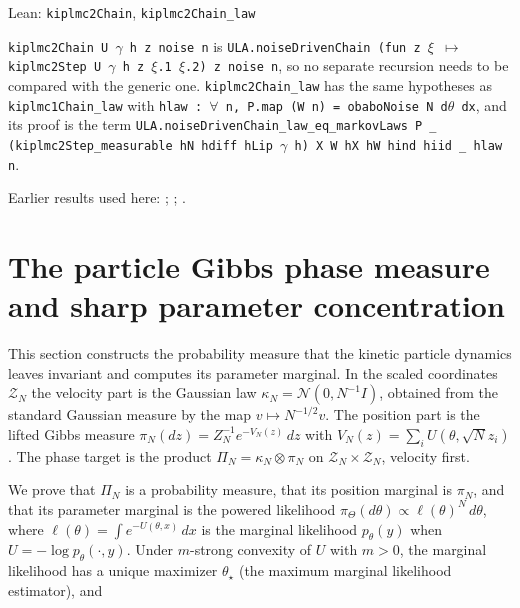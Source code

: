 \documentclass[11pt,a4paper]{report}
\newcommand{\leanlabel}[1]{\par\smallskip\noindent{\small\bfseries #1}\par}
\begin{document}
\begin{leanbox}{Lean: \texttt{kiplmc2Chain}, \texttt{kiplmc2Chain\_\allowbreak{}law}}
\leanlabel{How the Lean proof follows the argument}
\texttt{kiplmc2\allowbreak{}Chain U \ensuremath{\gamma} h z noise n} is \texttt{ULA.\allowbreak{}noise\allowbreak{}Driven\allowbreak{}Chain (fun z \ensuremath{\xi} \ensuremath{\mapsto} kiplmc2\allowbreak{}Step U \ensuremath{\gamma} h z \ensuremath{\xi}.\allowbreak{}1 \ensuremath{\xi}.\allowbreak{}2) z noise n}, so no separate recursion needs to be compared with the generic one. \texttt{kiplmc2\allowbreak{}Chain\_\allowbreak{}law} has the same hypotheses as \texttt{kiplmc1\allowbreak{}Chain\_\allowbreak{}law} with \texttt{hlaw : \ensuremath{\forall} n, P.\allowbreak{}map (W n) = obabo\allowbreak{}Noise N d\ensuremath{\theta} dx}, and its proof is the term \texttt{ULA.\allowbreak{}noise\allowbreak{}Driven\allowbreak{}Chain\_\allowbreak{}law\_\allowbreak{}eq\_\allowbreak{}markov\allowbreak{}Laws P \_\allowbreak{} (kiplmc2\allowbreak{}Step\_\allowbreak{}measurable h\allowbreak{}N hdiff h\allowbreak{}Lip \ensuremath{\gamma} h) X W h\allowbreak{}X h\allowbreak{}W hind hiid \_\allowbreak{} hlaw n}.
\end{leanbox}


Earlier results used here: \cite[Section~3.20.1]{LangevinLean2026ULASC}; \cite[Section~3.33.12]{LangevinLean2026ULASC}; \cite[Section~3.1.1]{LangevinLean2026IPLA}.
\section{\texorpdfstring{The particle Gibbs phase measure and sharp parameter concentration}{The particle Gibbs phase measure and sharp parameter concentration}}
\label{proof-module-KIPLMC-Target-lean}


This section constructs the probability measure that the kinetic particle dynamics leaves invariant and computes its parameter marginal. In the scaled coordinates \(\mathcal Z_N\) the velocity part is the Gaussian law \(\kappa_N=\mathcal N(0,N^{-1}I)\), obtained from the standard Gaussian measure by the map \(v\mapsto N^{-1/2}v\). The position part is the lifted Gibbs measure \(\pi_N(dz)=Z_N^{-1}e^{-V_N(z)}\,dz\) with \(V_N(z)=\sum_iU(\theta,\sqrt Nz_i)\). The phase target is the product \(\Pi_N=\kappa_N\otimes\pi_N\) on \(\mathcal Z_N\times\mathcal Z_N\), velocity first.




We prove that \(\Pi_N\) is a probability measure, that its position marginal is \(\pi_N\), and that its parameter marginal is the powered likelihood \(\pi_\Theta(d\theta)\propto\ell(\theta)^N\,d\theta\), where \(\ell(\theta)=\int e^{-U(\theta,x)}\,dx\) is the marginal likelihood \(p_\theta(y)\) when \(U=-\log p_\theta(\cdot,y)\). Under \(m\)-strong convexity of \(U\) with \(m>0\), the marginal likelihood has a unique maximizer \(\theta_\star\) (the maximum marginal likelihood estimator), and
\end{document}
